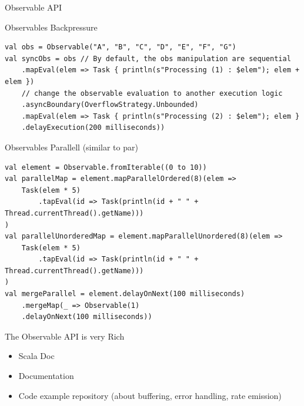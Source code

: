 \documentclass[presentation, 9pt]{beamer}\mode<presentation>{\usetheme{AMSBolognaFC}}
\begin{document}
\begin{frame}{Observable API}
				 \begin{alertblock}{Observables Backpressure}
					\begin{tcolorbox}[left=0pt, top=0pt, bottom=0pt]
								 \begin{verbatim}
val obs = Observable("A", "B", "C", "D", "E", "F", "G")
val syncObs = obs // By default, the obs manipulation are sequential
	.mapEval(elem => Task { println(s"Processing (1) : $elem"); elem + elem })
	// change the observable evaluation to another execution logic
	.asyncBoundary(OverflowStrategy.Unbounded)
	.mapEval(elem => Task { println(s"Processing (2) : $elem"); elem }
	.delayExecution(200 milliseconds))
								 \end{verbatim}
							 \end{tcolorbox}
					 \end{alertblock}	
					 \begin{alertblock}{Observables Parallell (similar to par)}
					\begin{tcolorbox}[left=0pt, top=0pt, bottom=0pt]
						\begin{verbatim}
val element = Observable.fromIterable((0 to 10))
val parallelMap = element.mapParallelOrdered(8)(elem =>
	Task(elem * 5)
		.tapEval(id => Task(println(id + " " + Thread.currentThread().getName)))
)
val parallelUnorderedMap = element.mapParallelUnordered(8)(elem =>
	Task(elem * 5)
		.tapEval(id => Task(println(id + " " + Thread.currentThread().getName)))
)
val mergeParallel = element.delayOnNext(100 milliseconds)
	.mergeMap(_ => Observable(1)
	.delayOnNext(100 milliseconds))
							\end{verbatim}
						\end{tcolorbox}
					\end{alertblock}	
					\begin{alertblock}{The Observable API is very Rich}
						\begin{itemize}
							\item Scala Doc \href{https://monix.io/api/current/monix/reactive/index.htmlhttps://monix.io/api/current/monix/reactive/index.html}{\faLink}
       				\item Documentation  \href{https://monix.io/docs/current/reactive/observable.html}{\faLink}
           \item Code example repository (about buffering, error handling, rate emission)  \href{https://github.com/cric96/scala-concurrent-programming/tree/main/src/main/scala/it/unibo/reactive}{\faLink}
						\end{itemize}
					\end{alertblock}	
\end{frame}
\end{document}

